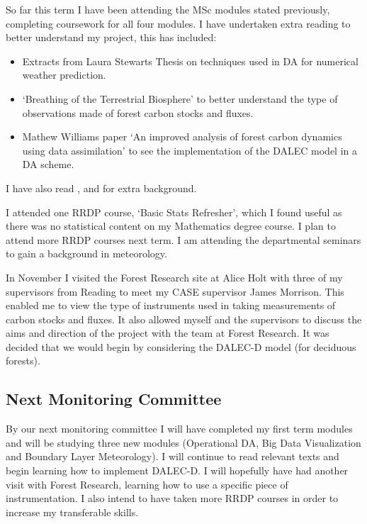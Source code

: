 \documentclass[11pt]{article}
\begin{document}
So far this term I have been attending the MSc modules stated previously, completing coursework for all four modules. I have undertaken extra reading to better understand my project, this has included:
\begin{itemize}
\item Extracts from Laura Stewarts Thesis \cite{stewart2008correlated} on techniques used in DA for numerical weather prediction.
\item `Breathing of the Terrestrial Biosphere' \cite{baldocchi2008turner} to better understand the type of observations made of forest carbon stocks and fluxes.
\item Mathew Williams paper `An improved analysis of forest carbon dynamics using data assimilation' \cite{williams2005improved} to see the implementation of the DALEC model in a DA scheme.
\end{itemize}
I have also read \cite{fox2009reflex},\cite{tiedeman2013effect} and \cite{delahaies2013regularization} for extra background.

I attended one RRDP course, `Basic Stats Refresher', which I found useful as there was no statistical content on my Mathematics degree course. I plan to attend more RRDP courses next term. I am attending the departmental seminars to gain a background in meteorology. 

In November I visited the Forest Research site at Alice Holt with three of my supervisors from Reading to meet my CASE supervisor James Morrison. This enabled me to view the type of instruments used in taking measurements of carbon stocks and fluxes. It also allowed myself and the supervisors to discuss the aims and direction of the project with the team at Forest Research. It was decided that we would begin by considering the DALEC-D model (for deciduous forests).

\subsection*{Next Monitoring Committee} 

By our next monitoring committee I will have completed my first term modules and will be studying three new modules (Operational DA, Big Data Visualization and Boundary Layer Meteorology). I will continue to read relevant texts and begin learning how to implement DALEC-D. I will hopefully have had another visit with Forest Research, learning how to use a specific piece of instrumentation. I also intend to have taken more RRDP courses in order to increase my transferable skills.


{}

\end{document}
